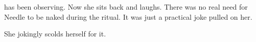 \begin{comment}
  \section{Achsah laughs}
\end{comment}
\new
\Achsah has been observing. 
Now she sits back and laughs. 
There was no real need for Needle to be naked during the ritual. 
It was just a practical joke \Achsah{} pulled on her. 

She jokingly scolds herself for it. 





